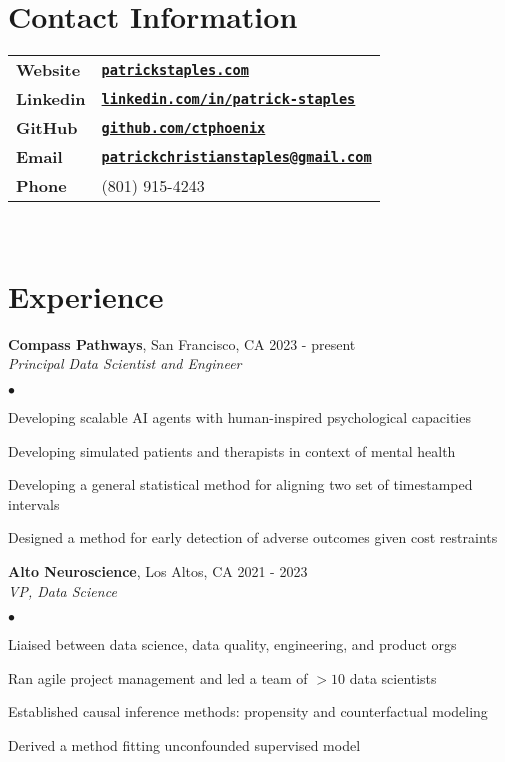 \documentclass[margin,line]{res}
\newenvironment{bulletlist}{
  \begin{list}{$\bullet$}{%
      \setlength{\itemsep}{0cm}
      \setlength{\parsep}{0cm}
      \setlength{\parskip}{0cm}
      \setlength{\topsep}{0cm}
      \setlength{\partopsep}{0cm}
      \setlength{\leftmargin}{0.15in}
      \setlength{\labelwidth}{0.05in}
      \setlength{\labelsep}{0.1in}
      \setlength{\itemindent}{0in}
      \setlength{\rightmargin}{0in}}}
  {\end{list}}
\let\oldhref\href
\renewcommand{\href}[2]{\oldhref{#1}{\textbf{#2}}}
\begin{document}

\begin{resume}
\section{\sc Contact Information}
\begin{tabular}{ll}
{\bf Website} & \href{https://patrickstaples.com}{\tt patrickstaples.com} \\
{\bf Linkedin} & \href{https://www.linkedin.com/in/patrick-staples}{\tt linkedin.com/in/patrick-staples} \\
{\bf GitHub}  & \href{https://github.com/ctphoenix}{\tt github.com/ctphoenix} \\
{\bf Email} & \href{mailto:patrickchristianstaples@gmail.com}{\tt patrickchristianstaples@gmail.com} \\
{\bf Phone}  & {(801) 915-4243} \\
\end{tabular}

\ \\[-.75cm]
\section{\sc Experience}
{\bf Compass Pathways}, San Francisco, CA \hfill{2023 - present }\\
\textit{Principal Data Scientist and Engineer} \\[-.35cm]
\begin{bulletlist}
\item Developing scalable AI agents with human-inspired psychological capacities
\item Developing simulated patients and therapists in context of mental health
\item Developing a general statistical method for aligning two set of timestamped intervals
\item Designed a method for early detection of adverse outcomes given cost restraints
\end{bulletlist}

{\bf Alto Neuroscience}, Los Altos, CA \hfill{2021 - 2023 }\\
\textit{VP, Data Science} \\[-.35cm]
\begin{bulletlist}
\item Liaised between data science, data quality, engineering, and product orgs
\item Ran agile project management and led a team of $>10$ data scientists
\item Established causal inference methods: propensity and counterfactual modeling
\item Derived a method fitting unconfounded supervised model
\end{bulletlist}
\vspace{-0.1cm}


\end{resume}
\end{document}
